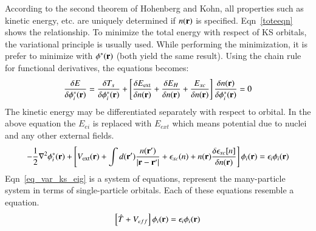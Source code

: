 According to the second theorem of Hohenberg and Kohn, all properties such as kinetic energy, etc. are uniquely determined if $n(\vb{r})$ is specified. Eqn~\eqref{toteeqn} shows the relationship. To minimize the total energy with respect of KS orbitals, the variational principle is usually used. While performing the minimization, it is prefer to minimize with $\phi^{\ast}(\vb{r})$ (both yield the same result). Using the chain rule for functional derivatives, the equations becomes:
\begin{equation}
\label{eq_var_ks}
\frac{\delta E}{\delta \phi^{\ast}_i(\vb{r})} = \frac{\delta T_s}{\delta \phi^{\ast}_i(\vb{r})} + \left [ \frac{\delta E_{\text{ext}}}{\delta n(\vb{r})} + \frac{\delta E_H}{\delta n(\vb{r})} + \frac{E_{xc}}{\delta n(\vb{r})}	\right ] \frac{\delta n(\vb{r})}{\delta \phi^{\ast}_i(\vb{r})}  = 0
\end{equation}
The kinetic energy may be differentiated separately with respect to orbital. In the above equation the $E_{ei}$ is replaced with $E_{ext}$ which means potential due to nuclei and any other external fields.
\begin{equation}
\label{eq_var_ks_eig}
-\frac{1}{2} \nabla^2 \phi^{\ast}_i (\vb{r}) + \left [ V_{\text{ext}} (\vb{r}) + \int d(\vb{r'}) \frac{n(\vb{r'})}{\abs{\vb{r}-\vb{r'}}} + \epsilon_{xc} (n) + n(\vb{r}) \frac{\delta \epsilon_{xc}[n]}{\delta n(\vb{r})}   \right ] \phi_i(\vb{r})  = \epsilon_i \phi_i (\vb{r})
\end{equation}
Eqn~\ref{eq_var_ks_eig} is a system of equations, represent the many-particle system in terms of single-particle orbitals. Each of these equations resemble a \schrod equation.
\begin{equation}
\label{eq_ks_s}
\left [ \hat{T} + V_{eff}\right ] \phi_i (\vb{r}) = \epsilon_i \phi_i (\vb{r})
\end{equation}

